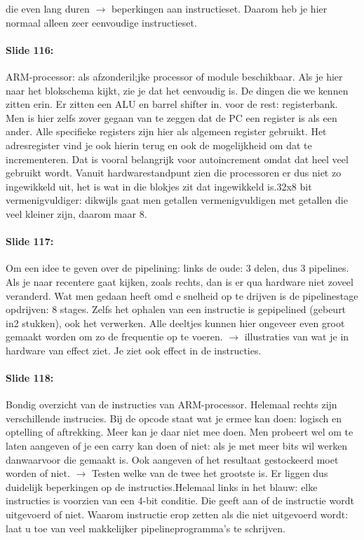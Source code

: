 \documentclass[10pt,a4paper]{book}
\begin{document}
die even lang duren $\rightarrow$ beperkingen aan instructieset. Daarom heb je hier normaal alleen zeer eenvoudige instructieset.

\paragraph{Slide 116:} ARM-processor: als afzonderil;jke processor of module beschikbaar. Als je hier naar het blokschema kijkt, zie je dat het eenvoudig is. De dingen die we kennen zitten erin. Er zitten een ALU en barrel shifter in. voor de rest: registerbank. Men is hier zelfs zover gegaan van te zeggen dat de PC een register is als een ander. Alle specifieke registers zijn hier als algemeen register gebruikt. Het adresregister vind je ook hierin terug en ook de mogelijkheid om dat te incrementeren. Dat is vooral belangrijk voor autoincrement omdat dat heel veel gebruikt wordt. Vanuit hardwarestandpunt zien die processoren er dus niet zo ingewikkeld uit, het is wat in die blokjes zit dat ingewikkeld is.32x8 bit vermenigvuldiger: dikwijls gaat men getallen vermenigvuldigen met getallen die veel kleiner zijn, daarom maar 8.

\paragraph{Slide 117:} Om een idee te geven over de pipelining: links de oude: 3 delen, dus 3 pipelines. Als je naar recentere gaat kijken, zoals rechts, dan is er qua hardware niet zoveel veranderd. Wat men gedaan heeft omd e snelheid op te drijven is de pipelinestage opdrijven: 8 stages. Zelfs het ophalen van een instructie is gepipelined (gebeurt in2 stukken), ook het verwerken. Alle deeltjes kunnen hier ongeveer even groot gemaakt worden om zo de frequentie op te voeren. $\rightarrow$ illustraties van wat je in hardware van effect ziet. Je ziet ook effect in de instructies.

\paragraph{Slide 118:} Bondig overzicht van de instructies van ARM-processor. Helemaal rechts zijn verschillende instrucies. Bij de opcode staat wat je ermee kan doen: logisch en optelling of aftrekking. Meer kan je daar niet mee doen. Men probeert wel om te laten aangeven of je een carry kan doen of niet: als je met meer bits wil werken danwaarvoor die gemaakt is. Ook aangeven of het resultaat gestockeerd moet worden of niet. $\rightarrow$ Testen welke van de twee het grootste is. Er liggen dus duidelijk beperkingen op de instructies.Helemaal links in het blauw: elke instructies is voorzien van een 4-bit conditie. Die geeft aan of de instructie wordt uitgevoerd of niet. Waarom instructie erop zetten als die niet uitgevoerd wordt: laat u toe van veel makkelijker pipelineprogramma's te schrijven.
\end{document}
